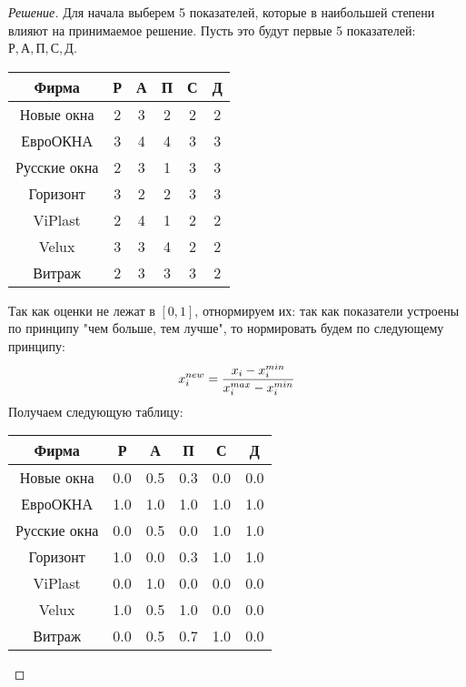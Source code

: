 \documentclass[11pt,a4paper,oneside]{article}
\newenvironment{solution}{
	\begin{proof}[Решение]
		\vspace{-8px}
		\setlength{\parskip}{4px}
		\setlength{\parindent}{0px}
	}{
	\end{proof}
}
\begin{document}
	\begin{solution}
		Для начала выберем 5 показателей, которые в наибольшей степени влияют на принимаемое решение. Пусть это будут первые 5 показателей: $Р, А, П, С, Д$.
		\begin{table}[!hbtp]
			\centering
			\begin{tabular}{|c|c|c|c|c|c|}
				\hline
				Фирма        & Р & А & П & С & Д  \\ \hline
				Новые окна   & 2 & 3 & 2 & 2 & 2   \\ \hline
				ЕвроОКНА     & 3 & 4 & 4 & 3 & 3  \\ \hline
				Русские окна & 2 & 3 & 1 & 3 & 3  \\ \hline
				Горизонт     & 3 & 2 & 2 & 3 & 3   \\ \hline
				ViPlast      & 2 & 4 & 1 & 2 & 2   \\ \hline
				Velux        & 3 & 3 & 4 & 2 & 2   \\ \hline
				Витраж       & 2 & 3 & 3 & 3 & 2   \\ \hline
			\end{tabular}
		\end{table}
		\newpage
		Так как оценки не лежат в $[0,1]$, отнормируем их: так как показатели устроены по принципу "чем больше, тем лучше", то нормировать будем по следующему принципу:
		\[
			x_i^{new} = \frac{x_i - x_i^{min}}{x_i^{max} - x_i^{min}}\\
		\]
		Получаем следующую таблицу:
		\begin{table}[!hbtp]
			\centering
			\begin{tabular}{|c|c|c|c|c|c|}
				\hline
				Фирма        & Р & А & П & С & Д  \\ \hline
				Новые окна   & 0.0 & 0.5 & 0.3 & 0.0 & 0.0  \\ \hline
				ЕвроОКНА     &1.0 & 1.0 & 1.0 & 1.0 & 1.0   \\ \hline
				Русские окна &0.0 & 0.5 & 0.0 & 1.0 & 1.0    \\ \hline
				Горизонт     & 1.0 & 0.0 & 0.3 & 1.0 & 1.0   \\ \hline
				ViPlast      & 0.0 & 1.0 & 0.0 & 0.0 & 0.0   \\ \hline
				Velux        & 1.0 & 0.5 & 1.0 & 0.0 & 0.0   \\ \hline
				Витраж       & 0.0 & 0.5 & 0.7 & 1.0 & 0.0   \\ \hline
			\end{tabular}
		\end{table}

\end{solution}
\end{document}
